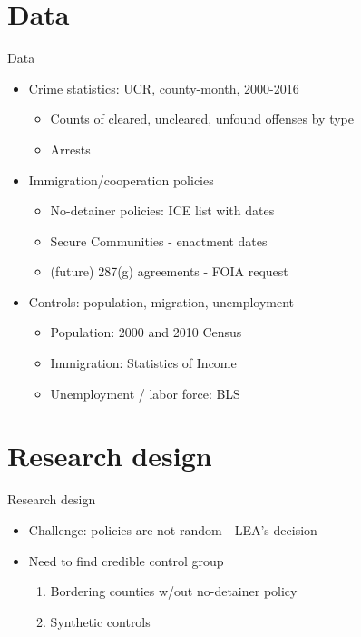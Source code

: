 \documentclass[xcolor=pdftex,dvipsnames,table]{beamer}
\begin{document}
\section{Data}
\begin{frame}{Data}
\begin{itemize}
\item Crime statistics: UCR, county-month, 2000-2016\vspace{0.10cm}\begin{itemize}
\item Counts of cleared, uncleared, unfound offenses by type\vspace{0.10cm}
\item Arrests
\end{itemize}\vspace{0.20cm}
\item Immigration/cooperation policies\vspace{0.10cm}
\begin{itemize}
\item No-detainer policies: ICE list with dates\vspace{0.10cm}
\item Secure Communities - enactment dates\vspace{0.10cm}
\item (future) 287(g) agreements - FOIA request
\end{itemize}\vspace{0.20cm}
\item Controls: population, migration, unemployment
\begin{itemize}
\item Population: 2000 and 2010 Census \vspace{0.10cm}
\item Immigration: Statistics of Income \vspace{0.10cm}
\item Unemployment / labor force: BLS
\end{itemize}
\end{itemize}
\end{frame}

\section{Research design}
\begin{frame}{Research design}
\begin{itemize}
\item Challenge: policies are not random - LEA's decision
\item Need to find credible control group
\begin{enumerate}
\item Bordering counties w/out no-detainer policy
\item Synthetic controls
\end{enumerate}
\end{itemize}
\end{frame}
\end{document}
